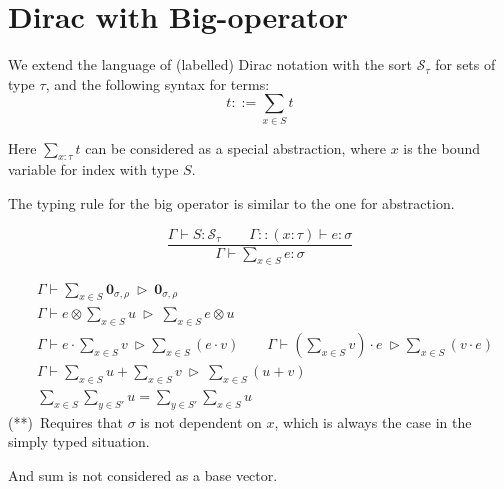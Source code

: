 \section{Dirac with Big-operator}
We extend the language of (labelled) Dirac notation with the sort $\mathcal{S}_\tau$ for sets of type $\tau$, and the following syntax for terms:
$$
t ::= \sum_{x \in S} t
$$

Here $\sum_{x : \tau} t$ can be considered as a special abstraction, where $x$ is the bound variable for index with type $S$.

\begin{definition}
  The typing rule for the big operator is similar to the one for abstraction.

  $$
  \frac{\Gamma \vdash S : \mathcal{S}_\tau\qquad \Gamma::(x : \tau) \vdash e : \sigma}{\Gamma \vdash \sum_{x \in S} e : \sigma}
  $$
  
\end{definition}

\begin{definition}
    \begin{align*}
        & \Gamma \vdash \sum_{x \in S} \mathbf{0}_{\sigma, \rho} \ \triangleright\ \mathbf{0}_{\sigma, \rho} \\
        & \Gamma \vdash e \otimes \sum_{x \in S} u \ \triangleright\ \sum_{x \in S} e \otimes u \\
        &\Gamma \vdash e\cdot \sum_{x \in S} v \ \triangleright \sum_{x \in S} (e\cdot v)
        \qquad 
        \Gamma \vdash (\sum_{x \in S} v) \cdot e\ \triangleright \sum_{x \in S} (v \cdot e)\\        
        & \Gamma \vdash \sum_{x \in S} u + \sum_{x \in S} v  \ \triangleright\ \sum_{x \in S} (u + v) \\
        \tag{**}
        & \sum_{x \in S} \sum_{y \in S'} u = \sum_{y \in S'} \sum_{x \in S} u
    \end{align*}
(**)\ Requires that $\sigma$ is not dependent on $x$, which is always the case in the simply typed situation.

And sum is not considered as a base vector.
\end{definition}











